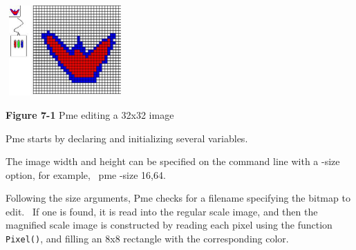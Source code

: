 \begin{center}
\includegraphics[width=1.7917in,height=1.3575in]{ub-img/ub-img11.jpg}
\end{center}

{\sffamily\bfseries Figure 7-1}
{\sffamily Pme editing a 32x32 image}

\bigskip

Pme starts by declaring and initializing several variables.

\bigskip


The image width and height can be specified on the command line with a
{}-size option, for example, \ pme -size 16,64.


Following the size arguments, Pme checks for a filename specifying the
bitmap to edit. \ If one is found, it is read into the regular scale
image, and then the magnified scale image is constructed by reading
each pixel using the function \texttt{Pixel()}, and filling an 8x8
rectangle with the corresponding color.

